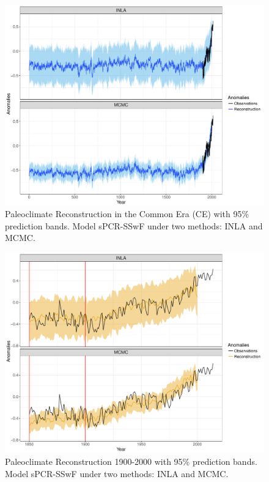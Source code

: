 \documentclass[11pt]{amsart}
\theoremstyle{plain}
\theoremstyle{definition}
\theoremstyle{remark}
\begin{document}

\begin{figure}[H]
  \centering
  \includegraphics[scale=0.35]{RecCE_MCMC}
  \caption{Paleoclimate Reconstruction in the Common Era (CE) with 95\%
    prediction bands. Model sPCR-SSwF under two methods: INLA and MCMC.}
  \label{fig:paleoCE4}
\end{figure}

\begin{figure}[H]
  \centering
  \includegraphics[scale=0.35]{Rec1900_MCMC}
  \caption{Paleoclimate Reconstruction 1900-2000 with 95\%
    prediction bands. Model sPCR-SSwF under two methods: INLA and MCMC.}
  \label{fig:paleo19004}
\end{figure}
\end{document}
